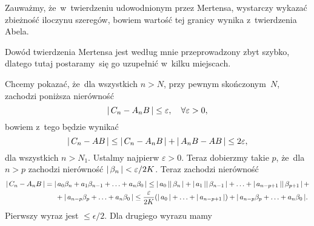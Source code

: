 \documentclass[a4paper,11pt]{article}
\begin{document}
\vspace{\spaceFour}





\noindent
{} Zauważmy, że~w~twierdzeniu udowodnionym przez Mertensa, wystarczy
wykazać zbieżność iloczynu szeregów, bowiem wartość tej granicy wynika
z~twierdzenia Abela.

\vspace{\spaceFour}





\noindent
{} Dowód twierdzenia Mertensa jest według mnie przeprowadzony zbyt
szybko, dlatego tutaj postaramy~się go uzupełnić w~kilku miejscach.

Chcemy pokazać, że~dla wszystkich $n > N$, przy pewnym skończonym~$N$,
zachodzi poniższa nierówność
\begin{equation}
  \label{eq:Leja-Funkcje-zespolone-14}
  |\, {  C_{ n } - A_{ n } B  } \,| \leq \varepsilon, \quad \forall \varepsilon > 0,
\end{equation}
bowiem z~tego będzie wynikać
\begin{equation}
  \label{eq:Leja-Funkcje-zespolone-15}
  |\, {  C_{ n } - AB  } \,| \leq
  |\, {  C_{ n } - A_{ n } B  } \,| + |\, {  A_{ n } B - AB  } \,| \leq 2 \varepsilon,
\end{equation}
dla wszystkich $n > N_{ 1 }$. Ustalmy najpierw $\varepsilon > 0$. Teraz
dobierzmy takie $p$, że~dla $n > p$ zachodzi nierówność
$|\, {  \beta_{ n }  } \,| < \varepsilon / 2K$. Teraz zachodzi nierówność
\begin{equation}
  \label{eq:Leja-Funkcje-zespolone-16}
  \begin{split}
    |\, {  C_{ n } - A_{ n } B  } \,|
    &=
      |\, {  a_{ 0 } \beta_{ n } + a_{ 1 } \beta_{ n - 1 } + \ldots + a_{ n } \beta_{ 0 }  } \,| \leq
      |\, {  a_{ 0 }  } \,| |\, {  \beta_{ n }  } \,|
      + |\, {  a_{ 1 }  } \,| |\, {  \beta_{ n - 1 }  } \,| + \ldots
      + |\, {  a_{ n - p + 1 }  } \,| |\, {  \beta_{ p + 1 }  } \,| \, + \\
    &\hspace{1.5em}
      + |\, {  a_{ n - p } \beta_{ p } + \ldots + a_{ n } \beta_{ 0 }  } \,| \leq
      \frac{ \varepsilon }{ 2K }
      ( |\, {  a_{ 0 }  } \,| + \ldots + |\, {  a_{ n - p + 1 }  } \,| )
      + |\, {  a_{ n - p } \beta_{ p } + \ldots + a_{ n } \beta_{ 0 }  } \,|.
  \end{split}
\end{equation}
Pierwszy wyraz jest $\leq \epsilon / 2$. Dla drugiego wyrazu mamy
\end{document}
